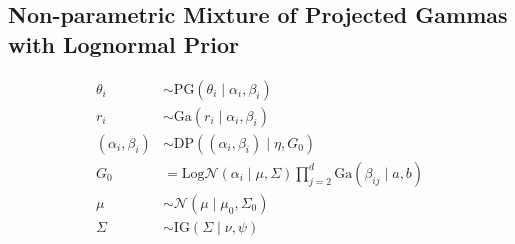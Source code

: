 
\subsection{Non-parametric Mixture of Projected Gammas with Lognormal Prior}
\label{method:npprobitnorm}

\begin{equation}
  \begin{aligned}
    \theta_i &\sim \text{PG}(\theta_i\mid \alpha_i,\beta_i)\\
    r_i &\sim \text{Ga}(r_i\mid \alpha_i,\beta_i)\\
    (\alpha_i,\beta_i) &\sim \text{DP}\left((\alpha_i,\beta_i)\mid \eta, G_0\right)\\
    G_0 &= \text{Log}\mathcal{N}(\alpha_i\mid\mu,\Sigma)\prod_{j = 2}^d\text{Ga}(\beta_{ij}\mid a, b)\\
    \mu &\sim \mathcal{N}(\mu\mid\mu_0,\Sigma_0)\\
    \Sigma &\sim \text{IG}(\Sigma\mid\nu,\psi)
  \end{aligned}
\end{equation}


